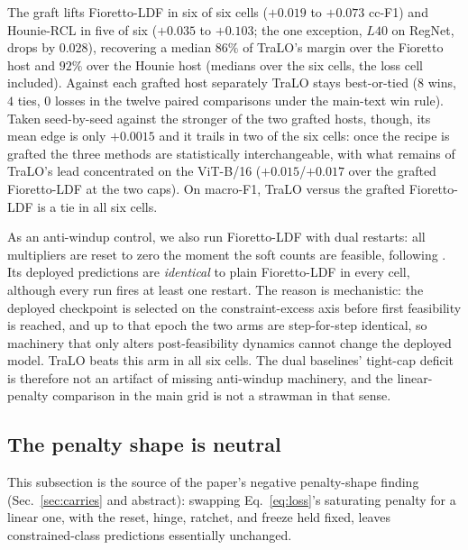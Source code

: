 \documentclass[10pt]{article}
\begin{document}
The graft lifts Fioretto-LDF in six of six cells ($+0.019$ to $+0.073$
cc-F1) and Hounie-RCL in five of six ($+0.035$ to $+0.103$; the one
exception, $L40$ on RegNet, drops by $0.028$), recovering a median
$86\%$ of TraLO's margin over the Fioretto host and $92\%$ over the
Hounie host (medians over the six cells, the loss cell included).
Against each grafted host separately TraLO stays best-or-tied ($8$
wins, $4$ ties, $0$ losses in the twelve paired comparisons under the
main-text win rule). Taken seed-by-seed against the stronger of the two
grafted hosts, though, its mean edge is only $+0.0015$ and it trails in
two of the six cells: once the recipe is grafted the three methods are
statistically interchangeable, with what remains of TraLO's lead
concentrated on the ViT-B/16 ($+0.015$/$+0.017$ over the grafted
Fioretto-LDF at the two caps). On macro-F1, TraLO versus the grafted
Fioretto-LDF is a tie in all six cells.

As an anti-windup control, we also run Fioretto-LDF with dual restarts:
all multipliers are reset to zero the moment the soft counts are
feasible, following \citet{gallego2022controlled}. Its deployed
predictions are \emph{identical} to plain Fioretto-LDF in every cell,
although every run fires at least one restart. The reason is
mechanistic: the deployed checkpoint is selected on the
constraint-excess axis before first feasibility is reached, and up to
that epoch the two arms are step-for-step identical, so machinery that
only alters post-feasibility dynamics cannot change the deployed model.
TraLO beats this arm in all six cells. The dual baselines' tight-cap
deficit is therefore not an artifact of missing anti-windup machinery,
and the linear-penalty comparison in the main grid is not a strawman in
that sense.

\subsection{The penalty shape is neutral}
\label{app:shape}

This subsection is the source of the paper's negative penalty-shape
finding (Sec.~\ref{sec:carries} and abstract): swapping
Eq.~\eqref{eq:loss}'s saturating penalty for a linear one, with the
reset, hinge, ratchet, and freeze held fixed, leaves constrained-class
predictions essentially unchanged.
\end{document}
